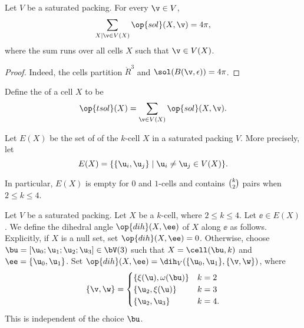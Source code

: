 \begin{lemma}
Let $V$ be a saturated packing.  For every $\v\in V$, 
\[
\sum_{X\mid \v\in V(X)}  \op{sol}(X,\v) = 4\pi,
\]
where the sum runs over all cells $X$ such that $\v\in V(X)$.
\end{lemma}

\begin{proof} Indeed, the cells partition $\ring{R}^3$ and
  $\sol(B(\v,\epsilon)) = 4\pi$.
\end{proof}

\begin{definition}[$\op{tsol}$] 
  Define
  the  of a cell $X$ to be
\[  
\op{tsol}(X) = \sum_{\v \in V(X) } \op{sol}(X,\v).
\] 
\end{definition}
%
%
%


\begin{definition}[edge]
  Let $E(X)$ be the set of  of the $k$-cell
  $X$ in a saturated packing $V$.  More precisely, let
\[ E(X)=\{\{ \u_i, \u_j\}\mid \u_i\ne \u_j\in
V( X)\}.\] 
%
\end{definition}

In particular, $E(X)$ is empty for $0$ and $1$-cells and contains
$\tbinom{k}{2}$ pairs when $2\le k\le 4$.

\begin{definition}[$\op{dih}$] \label{def:dihX}
Let $V$ be a saturated packing.  Let $X$ be
  a $k$-cell, where $2\le k\le 4$.  Let $\ee\in E(X)$.  We define the
  dihedral angle $\op{dih}(X,\ee)$ of $X$ along $\ee$ as follows.
  Explicitly, if $X$ is a null set, set
  $\op{dih}(X,\ee)=0$. Otherwise, choose $\bu=[\u_0;\u_1;\u_2;\u_3]\in
  \bV(3)$ such that $X=\cell(\bu,k)$ and $\ee=\{\u_0,\u_1\}$.  Set
  $\op{dih}(X,\ee)=\dih_V(\{\u_0,\u_1\},\{\v,\w\})$, where
\[
\{\v,\w\} = 
\begin{cases}
  \{\xi(\u),\omega(\bu) \} &  k=2\\
  \{\u_2,\xi(\u)\} & k=3\\
  \{\u_2,\u_3\} &k=4.
\end{cases}
\]
This is independent of the choice $\bu$. 
%
%
\end{definition}

